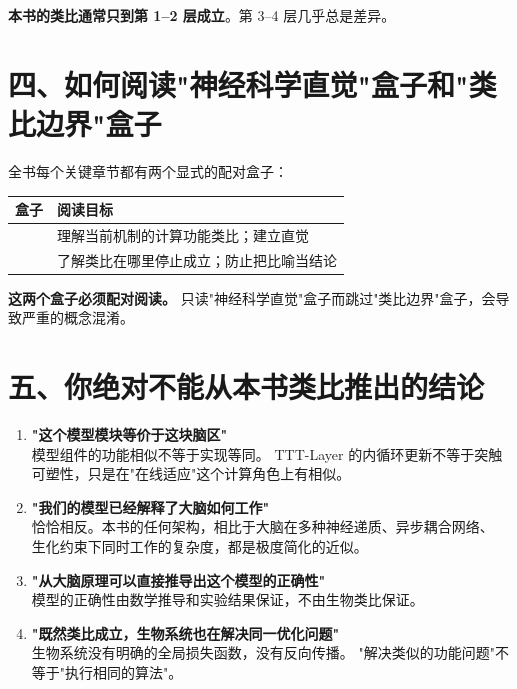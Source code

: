 \textbf{本书的类比通常只到第 1–2 层成立}。第 3–4 层几乎总是差异。

\section*{四、如何阅读"神经科学直觉"盒子和"类比边界"盒子}

全书每个关键章节都有两个显式的配对盒子：

\medskip
\begin{tabular}{p{5.5cm} p{8cm}}
\textbf{盒子} & \textbf{阅读目标} \\
\hline
\raisebox{0pt}{\colorbox{purple!5}{神经科学直觉}}
  & 理解当前机制的计算功能类比；建立直觉 \\
\raisebox{0pt}{\colorbox{red!3}{类比边界与失效条件}}
  & 了解类比在哪里停止成立；防止把比喻当结论 \\
\end{tabular}
\medskip

\textbf{这两个盒子必须配对阅读。}
只读"神经科学直觉"盒子而跳过"类比边界"盒子，会导致严重的概念混淆。

\section*{五、你绝对不能从本书类比推出的结论}

\begin{enumerate}
  \item \textbf{"这个模型模块等价于这块脑区"}\\
    模型组件的功能相似不等于实现等同。
    TTT-Layer 的内循环更新不等于突触可塑性，只是在"在线适应"这个计算角色上有相似。

  \item \textbf{"我们的模型已经解释了大脑如何工作"}\\
    恰恰相反。本书的任何架构，相比于大脑在多种神经递质、异步耦合网络、
    生化约束下同时工作的复杂度，都是极度简化的近似。

  \item \textbf{"从大脑原理可以直接推导出这个模型的正确性"}\\
    模型的正确性由数学推导和实验结果保证，不由生物类比保证。

  \item \textbf{"既然类比成立，生物系统也在解决同一优化问题"}\\
    生物系统没有明确的全局损失函数，没有反向传播。
    "解决类似的功能问题"不等于"执行相同的算法"。
\end{enumerate}

